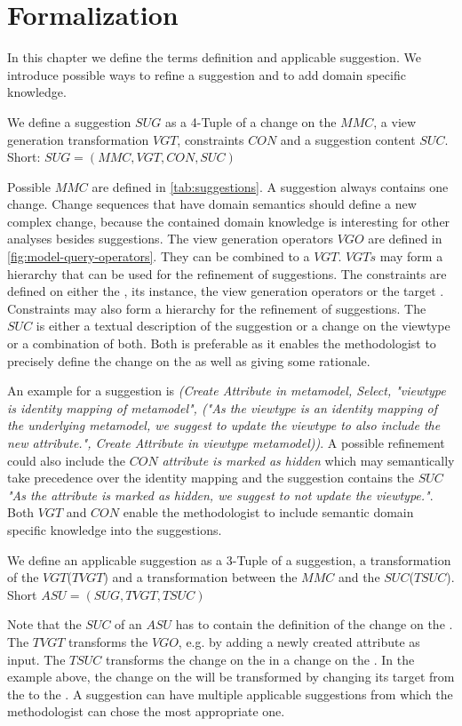 \section{Formalization}
\label{sec:Formalization}
In this chapter we define the terms definition and applicable suggestion. We introduce possible ways to refine a suggestion and to add domain specific knowledge.

\begin{definition}[Suggestion]
We define a suggestion $SUG$ as a 4-Tuple of a change on the \metamodel $MMC$, a view generation transformation $VGT$, constraints $CON$ and a suggestion content $SUC$. Short: $SUG = (MMC, VGT, CON, SUC)$
\end{definition}
Possible $MMC$ are defined in \cref{tab:suggestions}. A suggestion always contains one change. Change sequences that have domain semantics should define a new complex change, because the contained domain knowledge is interesting for other analyses besides suggestions. The view generation operators $VGO$ are defined in \cref{fig:model-query-operators}. They can be combined to a $VGT$. $VGTs$ may form a hierarchy that can be used for the refinement of suggestions. The constraints are defined on either the \metamodel, its instance, the view generation operators or the target \metamodel. Constraints may also form a hierarchy for the refinement of suggestions. The $SUC$ is either a textual description of the suggestion or a change on the viewtype or a combination of both. Both is preferable as it enables the methodologist to precisely define the change on the \viewtype \metamodel as well as giving some rationale.

An example for a suggestion is \textit{(Create Attribute in metamodel, Select,  "viewtype is identity mapping of metamodel", ("As the viewtype is an identity mapping of the underlying metamodel, we suggest to update the viewtype to also include the new attribute.", Create Attribute in viewtype metamodel))}. A possible refinement could also include the $CON$ \textit{attribute is marked as hidden} which may semantically take precedence over the identity mapping and the suggestion contains the $SUC$ \textit{"As the attribute is marked as hidden, we suggest to not update the viewtype."}. Both $VGT$ and $CON$ enable the methodologist to include semantic domain specific knowledge into the suggestions.

\begin{definition}
We define an applicable suggestion as a 3-Tuple of a suggestion, a transformation of the $VGT$($TVGT$) and a transformation between the $MMC$ and the $SUC$($TSUC$). Short $ASU = (SUG, TVGT, TSUC)$
\end{definition}
Note that the $SUC$ of an $ASU$ has to contain the definition of the change on the \viewtype \metamodel. The $TVGT$ transforms the $VGO$, e.g. by adding a newly created attribute as input. The $TSUC$ transforms the change on the \metamodel in a change on the \viewtype \metamodel. In the example above, the change on the \metamodel will be transformed by changing its target from the \metamodel to the \viewtype \metamodel. A suggestion can have multiple applicable suggestions from which the methodologist can chose the most appropriate one.